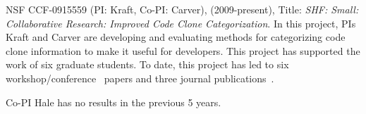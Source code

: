 
NSF CCF-0915559 (PI: Kraft, Co-PI: Carver), (2009-present), Title: \emph{SHF: Small: Collaborative Research: Improved Code Clone Categorization}. In this project, PIs Kraft and Carver are developing and evaluating methods for categorizing code clone information to make it useful for developers. This project has supported the work of six graduate students. To date, this project has led to six workshop/conference~\cite{Beard_et_al:11,Carver_et_al:11,Chatterji_et_al:11,Chatterji_et_al:10,Chatterji_et_al:12,Corley-etal:12} papers and three journal publications~\cite{Lukins_et_al:10,JeremyRPate_et_al_2011,Biggers-etal:12}.

Co-PI Hale has no results in the previous 5 years.

